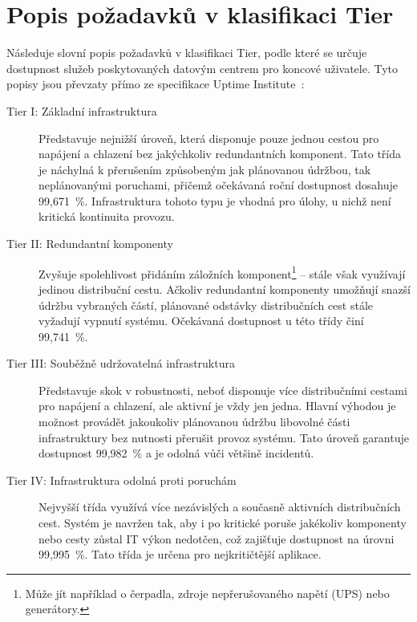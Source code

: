 \chapter{Popis požadavků v klasifikaci Tier}
\label{app:tiery}

Následuje slovní popis požadavků v klasifikaci Tier, podle které se určuje dostupnost služeb poskytovaných datovým centrem pro koncové uživatele. Tyto popisy jsou převzaty přímo ze specifikace Uptime Institute~\cite{turner_iv_tier_2008}:

\begin{description}
    \item[Tier I: Základní infrastruktura] Představuje nejnižší úroveň, která disponuje pouze jednou cestou pro napájení a chlazení bez jakýchkoliv redundantních komponent. Tato třída je náchylná k přerušením způsobeným jak plánovanou údržbou, tak neplánovanými poruchami, přičemž očekávaná roční dostupnost dosahuje 99,671~\%. Infrastruktura tohoto typu je vhodná pro úlohy, u nichž není kritická kontinuita provozu.
    
    \item[Tier II: Redundantní komponenty] Zvyšuje spolehlivost přidáním záložních komponent\footnote{Může jít například o čerpadla, zdroje nepřerušovaného napětí (UPS) nebo generátory.} -- stále však využívají jedinou distribuční cestu. Ačkoliv redundantní komponenty umožňují snazší údržbu vybraných částí, plánované odstávky distribučních cest stále vyžadují vypnutí systému. Očekávaná dostupnost u této třídy činí 99,741~\%.
    
    \item[Tier III: Souběžně udržovatelná infrastruktura] Představuje skok v robustnosti, neboť disponuje více distribučními cestami pro napájení a chlazení, ale aktivní je vždy jen jedna. Hlavní výhodou je možnost provádět jakoukoliv plánovanou údržbu libovolné části infrastruktury bez nutnosti přerušit provoz systému. Tato úroveň garantuje dostupnost 99,982~\% a je odolná vůči většině incidentů.

    \item[Tier IV: Infrastruktura odolná proti poruchám] Nejvyšší třída využívá více nezávislých a současně aktivních distribučních cest. Systém je navržen tak, aby i po kritické poruše jakékoliv komponenty nebo cesty zůstal IT výkon nedotčen, což zajišťuje dostupnost na úrovni 99,995~\%. Tato třída je určena pro nejkritičtější aplikace.
\end{description}
